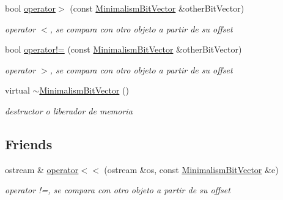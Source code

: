 \begin{DoxyCompactItemize}
bool \hyperlink{class_minimalism_bit_vector_ae81b007ae02dc1263bda1bc0d217c125}{operator$>$} (const \hyperlink{class_minimalism_bit_vector}{Minimalism\-Bit\-Vector} \&other\-Bit\-Vector)
\begin{DoxyCompactList}\small\item\em operator $<$, se compara con otro objeto a partir de su offset \end{DoxyCompactList}\item 
bool \hyperlink{class_minimalism_bit_vector_afa354ed29c29fcea2bfc453aa2edb9e7}{operator!=} (const \hyperlink{class_minimalism_bit_vector}{Minimalism\-Bit\-Vector} \&other\-Bit\-Vector)
\begin{DoxyCompactList}\small\item\em operator $>$, se compara con otro objeto a partir de su offset \end{DoxyCompactList}\item 
\hypertarget{class_minimalism_bit_vector_a3c8458d181a7dedc5fe95d4e4cc1667a}{virtual \hyperlink{class_minimalism_bit_vector_a3c8458d181a7dedc5fe95d4e4cc1667a}{$\sim$\-Minimalism\-Bit\-Vector} ()}\label{class_minimalism_bit_vector_a3c8458d181a7dedc5fe95d4e4cc1667a}

\begin{DoxyCompactList}\small\item\em destructor o liberador de memoria \end{DoxyCompactList}\end{DoxyCompactItemize}
\subsection*{Friends}
\begin{DoxyCompactItemize}
\item 
ostream \& \hyperlink{class_minimalism_bit_vector_ab3123b16267666cc75c71b1cfb9a8a52}{operator$<$$<$} (ostream \&os, const \hyperlink{class_minimalism_bit_vector}{Minimalism\-Bit\-Vector} \&e)
\begin{DoxyCompactList}\small\item\em operator !=, se compara con otro objeto a partir de su offset \end{DoxyCompactList}\end{DoxyCompactItemize}


